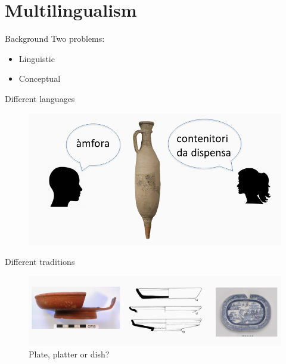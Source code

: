 \documentclass[xcolor=x11names, aspectratio=169,usenames,dvipsnames]{beamer}
\begin{document}


\section{Multilingualism}

\begin{frame}{Background}
Two problems:
\begin{itemize}
\item Linguistic
\item Conceptual
\end{itemize}
\end{frame}

\begin{frame}{Different languages}
\begin{center}
\begin{figure}
\includegraphics[width=\textwidth]{img/tim_vocab_1.png}
\end{figure}
\end{center}
\end{frame}

\begin{frame}{Different traditions}
\begin{center}
\begin{figure}
\includegraphics[width=\textwidth]{img/tim_plate_platter_dish.jpg}
\caption{Plate, platter or dish?}
\end{figure}
\end{center}
\end{frame}
\end{document}
